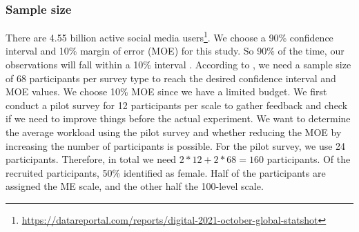 \subsubsection{Sample size}
There are 4.55 billion active social media users\footnote{\url{https://datareportal.com/reports/digital-2021-october-global-statshot}}.
%
We choose a 90\% confidence interval and 10\% margin of error (MOE) for this study.
%
So 90\% of the time, our observations will fall within a 10\% interval \citep{olson2014ways}.
%
According to \citet{olson2014ways}, we need a sample size of 68 participants per survey type to reach the desired confidence interval and MOE values.
%
We choose 10\% MOE since we have a limited budget.
%
We first conduct a pilot survey for 12 participants per scale to gather feedback and check if we need to improve things before the actual experiment.
%
We want to determine the average workload using the pilot survey and whether reducing the MOE by increasing the number of participants is possible.
%
For the pilot survey, we use 24 participants.
%
Therefore, in total we need $2*12+2*68 = 160$ participants.
%
Of the recruited participants, 50\% identified as female.
%
Half of the participants are assigned the ME scale, and the other half the 100-level scale.


